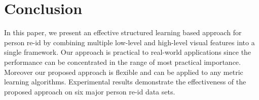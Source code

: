 \documentclass[10pt,twocolumn,letterpaper]{article}
\begin{document}
\section{Conclusion}
In this paper, we present an effective structured learning based
approach for person
re-id by combining multiple low-level and high-level
visual features into a single framework.
Our approach is practical to real-world applications
since the performance can be concentrated in the range of
most practical importance.
Moreover our proposed approach is  flexible and can be applied
to any metric learning algorithms.
Experimental results demonstrate the effectiveness of the
proposed approach on six major person re-id data sets.




{\small


}
\end{document}
